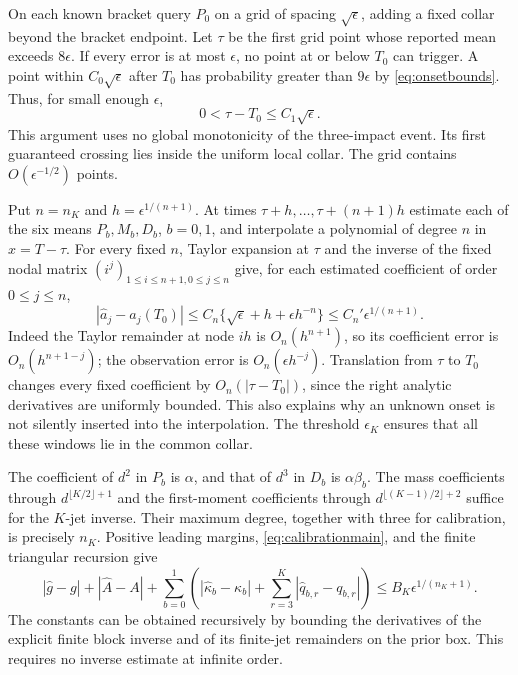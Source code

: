 On each known bracket query $P_0$ on a grid of spacing
$\sqrt\epsilon$, adding a fixed collar beyond the bracket endpoint.
Let $\tau$ be the first grid point whose reported mean exceeds
$8\epsilon$. If every error is at most $\epsilon$, no point at or
below $T_0$ can trigger. A point within $C_0\sqrt\epsilon$ after
$T_0$ has probability greater than $9\epsilon$ by
\eqref{eq:onsetbounds}. Thus, for small enough $\epsilon$,
\begin{equation}\label{eq:onsetestimate}
             0<\tau-T_0\le C_1\sqrt\epsilon.
\end{equation}
This argument uses no global monotonicity of the three-impact event.
Its first guaranteed crossing lies inside the uniform local collar.
The grid contains $O(\epsilon^{-1/2})$ points.

Put $n=n_K$ and $h=\epsilon^{1/(n+1)}$. At times
$\tau+h,\ldots,\tau+(n+1)h$ estimate each of the six means
$P_b,M_b,D_b$, $b=0,1$, and interpolate a polynomial of degree $n$
in $x=T-\tau$. For every fixed $n$, Taylor expansion at $\tau$ and
the inverse of the fixed nodal matrix $(i^j)_{1\le i\le n+1,0\le j\le n}$
give, for each estimated coefficient of order $0\le j\le n$,
\begin{equation}\label{eq:coefficientnoise}
 |\widehat a_j-a_j(T_0)|
 \le C_n\{\sqrt\epsilon+h+\epsilon h^{-n}\}
 \le C_n'\epsilon^{1/(n+1)}.
\end{equation}
Indeed the Taylor remainder at node $ih$ is $O_n(h^{n+1})$,
so its coefficient error is $O_n(h^{n+1-j})$; the observation error
is $O_n(\epsilon h^{-j})$. Translation from $\tau$ to $T_0$
changes every fixed coefficient by $O_n(|\tau-T_0|)$, since the
right analytic derivatives are uniformly bounded. This also explains
why an unknown onset is not silently inserted into the interpolation.
The threshold $\epsilon_K$ ensures that all these windows lie in the
common collar.

The coefficient of $d^2$ in $P_b$ is $\alpha$, and that of $d^3$
in $D_b$ is $\alpha\beta_b$. The mass coefficients through
$d^{\lfloor K/2\rfloor+1}$ and the first-moment coefficients through
$d^{\lfloor(K-1)/2\rfloor+2}$ suffice for the $K$-jet inverse.
Their maximum degree, together with three for calibration, is precisely
$n_K$. Positive leading margins, \eqref{eq:calibrationmain}, and the
finite triangular recursion give
\begin{equation}\label{eq:jetnoise}
 |\widehat g-g|+|\widehat A-A|
 +\sum_{b=0}^1\left(|\widehat\kappa_b-\kappa_b|
          +\sum_{r=3}^K|\widehat q_{b,r}-q_{b,r}|\right)
 \le B_K\epsilon^{1/(n_K+1)}.
\end{equation}
The constants can be obtained recursively by bounding the derivatives
of the explicit finite block inverse and of its finite-jet remainders
on the prior box. This requires no inverse estimate at infinite order.

